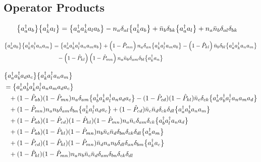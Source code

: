 {%
\subsection*{Operator Products}
\begin{align}
  \big\{a^\dag_{a}a_{b}\big\}\big\{a^\dag_{k}a_{l}\big\}
  &=\big\{a^\dag_{a}a^\dag_{k}a_{l}a_{b}\big\}
    -n_a\delta_{al}\big\{a^\dag_{k}a_{b}\big\}
    +\bar{n}_b\delta_{bk}\big\{a^\dag_{a}a_{l}\big\}
    +n_a\bar{n}_b\delta_{al}\delta_{bk}
\end{align}



\begin{align}
  \big\{a^\dag_{a}a_{b}\big\}\big\{a^\dag_{k}a^\dag_{l}a_{n}a_{m}\big\}
  &=\big\{a^\dag_{a}a^\dag_{k}a^\dag_{l}a_{n}a_{m}a_{b}\big\}
    +\left(1-\hat{P}_{mn}\right)n_a\delta_{an}\big\{a^\dag_{k}a^\dag_{l}a_{m}a_{b}\big\}
    -\left(1-\hat{P}_{kl}\right)\bar{n}_b\delta_{bl}\big\{a^\dag_{a}a^\dag_{k}a_{n}a_{m}\big\}\notag\\
  &\hphantom{=}  
    -\left(1-\hat{P}_{kl}\right)\left(1-\hat{P}_{mn}\right)n_{a}\bar{n}_{b}\delta_{am}\delta_{bl}\big\{a^\dag_{k}a_{n}\big\}
\end{align}



\begin{align}
  &\nord{\aaO_{a}\aaO_{b}\aO_{d}\aO_{c}}\nord{\aaO_{k}\aaO_{l}\aO_{n}\aO_{m}}
  \notag\\
  &=\nord{\aaO_{a}\aaO_{b}\aaO_{k}\aaO_{l}\aO_{n}\aO_{m}\aO_{d}\aO_{c}}
    \notag\\
  &\hphantom{=}
    +(1-\PO_{ab})(1-\PO_{mn})n_a\delta_{am}\nord{\aaO_{b}\aaO_{k}\aaO_{l}\aO_{n}\aO_{d}\aO_{c}}
    -(1-\PO_{cd})(1-\PO_{kl})\nn_c\delta_{ck}\nord{\aaO_{a}\aaO_{b}\aaO_{l}\aO_{n}\aO_{m}\aO_{d}}
  \notag\\
%  
  &\hphantom{=}
    +(1-\PO_{mn})n_an_b\delta_{am}\delta_{bn}\nord{\aaO_{k}\aaO_{l}\aO_{d}\aO_{c}}
    +(1-\PO_{cd})\nn_c\nn_d\delta_{ck}\delta_{dl}\nord{\aaO_{a}\aaO_{b}\aO_{n}\aO_{m}}
  \notag\\
  &\hphantom{=}
    +(1-\PO_{ab})(1-\PO_{cd})(1-\PO_{kl})(1-\PO_{mn})n_a\nn_c\delta_{am}\delta_{ck}\nord{\aaO_{b}\aaO_{l}\aO_{n}\aO_{d}}
  \notag\\
%   
  &\hphantom{=}
  +(1-\PO_{ab})(1-\PO_{kl})(1-\PO_{mn})
    n_b \nn_c \nn_d \delta_{bn}\delta_{ck}\delta_{dl}
    \nord{\aaO_{a}\aO_{m}}
  \notag\\
%
  &\hphantom{=}
   +(1-\PO_{cd})(1-\PO_{kl})(1-\PO_{mn})
     \nn_d n_a n_b \delta_{dl}\delta_{an}\delta_{bm}
    \nord{\aaO_{k}\aO_{c}}
  \notag\\
%
%
%
  &\hphantom{=}
    + (1-\PO_{kl})(1-\PO_{mn})n_a n_b \nn_c \nn_d  \delta_{am}\delta_{bn}\delta_{ck}\delta_{dl}
\end{align}

}
